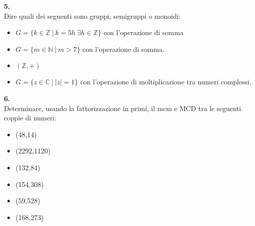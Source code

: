 \documentclass[italian,a4paper,11pt]
{article}
\newcommand{\Z}{\mathbb Z}
\newcommand{\N}{\mathbb{N}}
\newcommand{\C}{\mathbb{C}}
\begin{document}
\vspace{0.4cm}
\noindent
\begin{Ex}\textbf{ 5.}\\
Dire quali dei seguenti sono gruppi, semigruppi o monoidi:
\begin{itemize}
	\item $G=\{k\in \Z \  |\  k=5h\  \exists h\in \Z\}$ con l'operazione di somma  
	\item $G=\{m\in \N \ | \ m>7\}$ con l'operazione di somma.
	\item $(\Z,+)$
	\item $G=\{z\in \C \ | \ |z|=1\}$ con l'operazione di moltiplicazione tra numeri complessi. 
\end{itemize}
\end{Ex}

\vspace{0.4cm}
\noindent
\begin{Ex}\textbf{ 6.}\\ 
Determinare, usando la fattorizzazione in primi, il mcm e MCD tra le seguenti coppie di numeri:
\begin{itemize}
	\item (48,14)
	\item (2292,1120)
	\item (132,84)
	\item (154,308)
	\item (59,528)
	\item (168,273)
\end{itemize}
\end{Ex}
\end{document}
